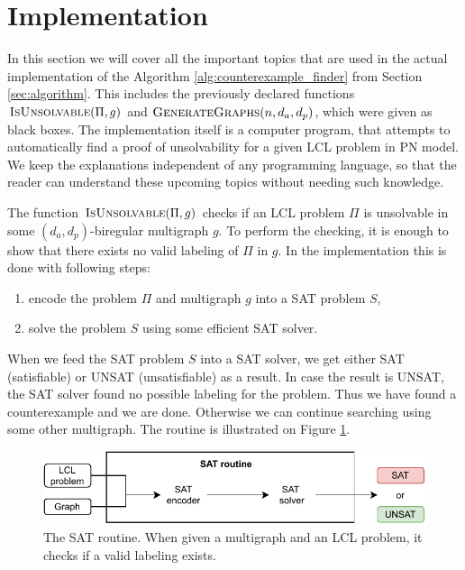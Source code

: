 
\section{Implementation} \label{sec:implementation}
In this section we will cover all the important topics that are used in the actual implementation of the Algorithm \ref{alg:counterexample_finder} from Section \ref{sec:algorithm}.
This includes the previously declared functions $\textsc{IsUnsolvable}(\Pi, g)$ and $\textsc{GenerateGraphs}(n, d_a, d_p)$, which were given as black boxes.
The implementation itself is a computer program, that attempts to automatically find a proof of unsolvability for a given LCL problem in PN model.
We keep the explanations independent of any programming language, so that the reader can understand these upcoming topics without needing such knowledge.

The function $\textsc{IsUnsolvable}(\Pi, g)$ checks if an LCL problem $\Pi$ is unsolvable in some $(d_a, d_p)$-biregular multigraph $g$.
To perform the checking, it is enough to show that there exists no valid labeling of $\Pi$ in $g$.
In the implementation this is done with following steps:
\begin{enumerate}
    \item encode the problem $\Pi$ and multigraph $g$ into a SAT problem $S$,
    \item solve the problem $S$ using some efficient SAT solver.
\end{enumerate}
When we feed the SAT problem $S$ into a SAT solver, we get either SAT (satisfiable) or UNSAT (unsatisfiable) as a result.
In case the result is UNSAT, the SAT solver found no possible labeling for the problem.
Thus we have found a counterexample and we are done.
Otherwise we can continue searching using some other multigraph.
The routine is illustrated on Figure \ref{fig:implementation:1}.

\begin{figure}[H]
\centering
\includegraphics[]{diagrams/implementation_idea_diagram2.pdf}
\caption{The SAT routine. When given a multigraph and an LCL problem, it checks if a valid labeling exists.}
\label{fig:implementation:1}
\end{figure}

